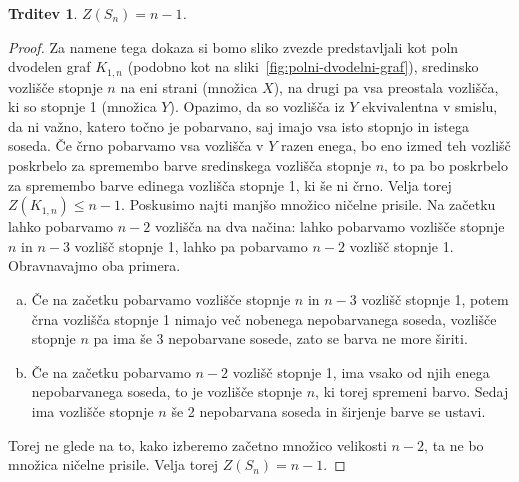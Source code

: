 \documentclass[12pt,a4paper,twoside]{article}
\theoremstyle{definition} %
\theoremstyle{plain} %
\newtheorem{trditev}[definicija]{Trditev}
\numberwithin{equation}{section}  %
\begin{document}
\begin{trditev}
    $Z(S_n) = n - 1$.
\end{trditev}
\begin{proof}
    Za namene tega dokaza si bomo sliko zvezde predstavljali kot poln dvodelen graf $K_{1,n}$ (podobno kot na sliki~\ref{fig:polni-dvodelni-graf}), sredinsko vozlišče stopnje $n$ na eni strani (množica $X$), na drugi pa vsa preostala vozlišča, ki so stopnje 1 (množica $Y$).
    Opazimo, da so vozlišča iz $Y$ ekvivalentna v smislu, da ni važno, katero točno je pobarvano, saj imajo vsa isto stopnjo in istega soseda. Če črno pobarvamo vsa vozlišča v $Y$ razen enega, bo eno izmed teh vozlišč poskrbelo za spremembo barve sredinskega vozlišča stopnje $n$, to pa bo poskrbelo za spremembo barve edinega vozlišča stopnje 1, ki še ni črno. Velja torej $Z(K_{1,n}) \leq n-1$. Poskusimo najti manjšo množico ničelne prisile. Na začetku lahko pobarvamo $n-2$ vozlišča na dva načina: lahko pobarvamo vozlišče stopnje $n$ in $n-3$ vozlišč stopnje 1, lahko pa pobarvamo $n-2$ vozlišč stopnje 1. Obravnavajmo oba primera.
    \begin{enumerate}[a)]
        \item Če na začetku pobarvamo vozlišče stopnje $n$ in $n-3$ vozlišč stopnje 1, potem črna vozlišča stopnje 1 nimajo več nobenega nepobarvanega soseda, vozlišče stopnje $n$ pa ima še 3 nepobarvane sosede, zato se barva ne more širiti. 
        \item Če na začetku pobarvamo $n-2$ vozlišč stopnje 1, ima vsako od njih enega nepobarvanega soseda, to je vozlišče stopnje $n$, ki torej spremeni barvo. Sedaj ima vozlišče stopnje $n$ še 2 nepobarvana soseda in širjenje barve se ustavi.
    \end{enumerate}
    Torej ne glede na to, kako izberemo začetno množico velikosti $n-2$, ta ne bo množica ničelne prisile. Velja torej $Z(S_n) = n-1$.
\end{proof}
\end{document}
